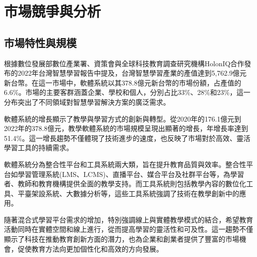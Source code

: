 \section{市場競爭與分析}

\subsection{市場特性與規模}

根據數位發展部數位產業署、資策會與全球科技教育調查研究機構HolonIQ合作發布的2022年台灣智慧學習報告中提及，台灣智慧學習產業的產值達到5,762.9億元新台幣。在這一市場中，軟體系統以其378.8億元新台幣的市場份額，占產值的6.6\%。市場的主要客群涵蓋企業、學校和個人，分別占比33\%、28\%和23\%，這一分布突出了不同領域對智慧學習解決方案的廣泛需求。

軟體系統的增長顯示了教學與學習方式的創新與轉型。從2020年的176.1億元到2022年的378.8億元，教學軟體系統的市場規模呈現出顯著的增長，年增長率達到51.4\%。這一增長趨勢不僅體現了技術進步的速度，也反映了市場對於高效、靈活學習工具的持續需求。

軟體系統分為整合性平台和工具系統兩大類，旨在提升教育品質與效率。整合性平台如學習管理系統(LMS、LCMS)、直播平台、媒合平台及社群平台等，為學習者、教師和教育機構提供全面的教學支持。而工具系統則包括教學內容的數位化工具、平臺架設系統、大數據分析等，這些工具系統強調了技術在教學創新中的應用。

隨著混合式學習平台需求的增加，特別強調線上與實體教學模式的結合，希望教育活動同時在實體空間和線上進行，從而提高學習的靈活性和可及性。這一趨勢不僅顯示了科技在推動教育創新方面的潛力，也為企業和創業者提供了豐富的市場機會，促使教育方法向更加個性化和高效的方向發展。

